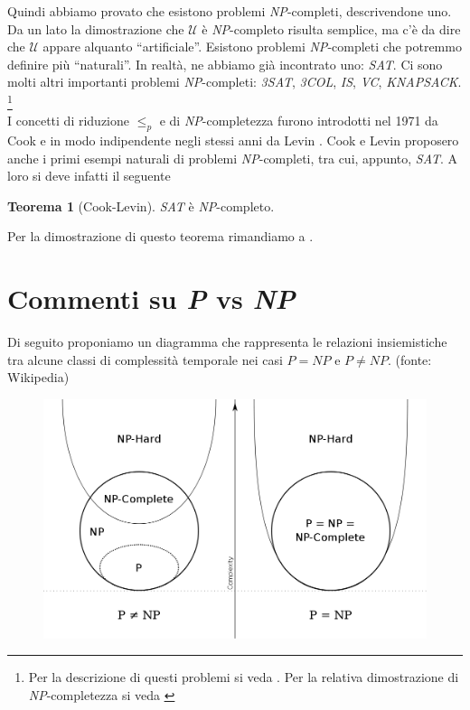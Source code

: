 \documentclass[12pt,a4paper]{report}
\theoremstyle{definition}
\newtheorem{teo}{Teorema}[section]  %
\begin{document}
Quindi abbiamo provato che esistono problemi \emph{NP}-completi, descrivendone uno. Da un lato la dimostrazione che $\mathcal{U}$ è \emph{NP}-completo risulta semplice, ma c'è da dire che $\mathcal{U}$ appare alquanto ``artificiale''. Esistono problemi \emph{NP}-completi che potremmo definire più ``naturali''. In realtà, ne abbiamo già incontrato uno: \emph{SAT}. Ci sono molti altri importanti problemi \emph{NP}-completi: \emph{3SAT}, \emph{3COL}, \emph{IS}, \emph{VC}, \emph{KNAPSACK}. \footnote{Per la descrizione di questi problemi si veda \cite[pagg. 144 e succ.]{Toffalori:tesi}. Per la relativa dimostrazione di \emph{NP}-completezza si veda \cite[pagg. 160 e succ.]{Toffalori:tesi}}\\
I concetti di riduzione $\leq_p$ e di \emph{NP}-completezza furono introdotti nel 1971 da Cook e in modo indipendente negli stessi anni da Levin \cite[pag. 154]{Toffalori:tesi}. Cook e Levin proposero anche i primi esempi naturali di problemi \emph{NP}-completi, tra cui, appunto, \emph{SAT}. A loro si deve infatti il seguente

\begin{teo}[Cook-Levin]
\emph{SAT} è \emph{NP}-completo.
\end{teo}

Per la dimostrazione di questo teorema rimandiamo a \cite[pag. 154]{Toffalori:tesi}.


\section{Commenti su \emph{P} vs \emph{NP}}

Di seguito proponiamo un diagramma che rappresenta le relazioni insiemistiche tra alcune classi di complessità temporale nei casi $P=NP$ e $P \neq NP$. (fonte: Wikipedia)

		 \begin{figure}[h]
			\centering
			\includegraphics[width=120mm, keepaspectratio]{images/diagramma_classi}		 
		 \end{figure}
\end{document}
